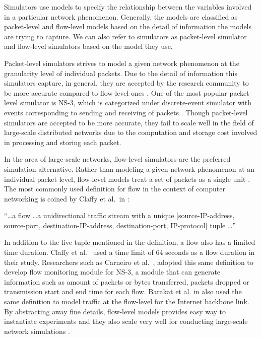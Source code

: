 Simulators use models to specify the relationship between the variables involved in a particular network phenomenon. Generally, the models are classified as packet-level and flow-level models based on the detail of information the models are trying to capture. We can also refer to simulators as packet-level simulator and flow-level simulators based on the model they use. 

Packet-level simulators strives to model a given network phenomenon at the granularity level of individual packets. Due to the detail of information this simulators capture, in general, they are accepted by the research community to be more accurate compared to flow-level ones \cite{DBLP:journals/jpdc/CasanovaGLQS14}. One of the most popular packet-level simulator is NS-3, which is categorized under discrete-event simulator with events corresponding to sending and receiving of packets \cite{ns3}. Though packet-level simulators are accepted to be more accurate, they fail to scale well in the field of large-scale distributed networks due to the computation and storage cost involved in processing and storing each packet. 

In the area of large-scale networks, flow-level simulators are the preferred simulation alternative. Rather than modeling a given network phenomenon at an individual packet level, flow-level models treat a set of packets as a single unit \cite{DBLP:journals/jpdc/CasanovaGLQS14}. The most commonly used definition for flow in the context of computer networking is coined by Claffy et al.{\ }in \cite{claffy1998nature}: 

``\ldots a flow \ldots a unidirectional traffic stream with a unique [source-IP-address, source-port, destination-IP-address, destination-port, IP-protocol] tuple \ldots''

In addition to the five tuple mentioned in the definition, a flow also has a limited time duration. Claffy et al.{\ }\cite{claffy1998nature} used a time limit of 64 seconds as a flow duration in their study. Researchers such as Carneiro et al.{\ }\cite{DBLP:conf/valuetools/CarneiroFR09}, adopted this same definition to develop flow monitoring module for NS-3, a module that can generate information such as amount of packets or bytes transferred, packets dropped or transmission start and end time for each flow. Barakat et al. in \cite{DBLP:journals/tsp/BarakatTIDO03} also used the same definition to model traffic at the flow-level for the Internet backbone link. By abstracting away fine details, flow-level models provides easy way to instantiate experiments and they also scale very well for conducting large-scale network simulations \cite{DBLP:journals/jpdc/CasanovaGLQS14,DBLP:journals/tsp/BarakatTIDO03}.

